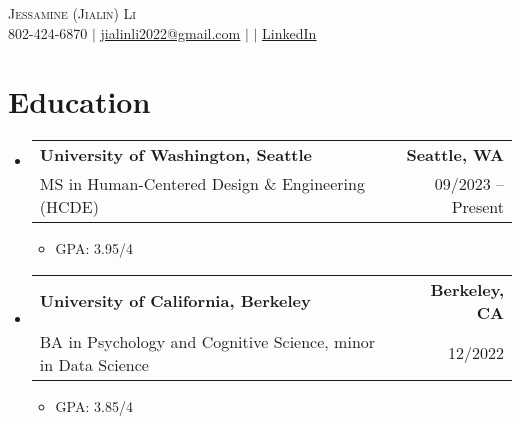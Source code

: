\documentclass[letterpaper,11pt]{article}
\makeatletter
\newcommand{\resumeItem}[1]{
  \item\small{
    {#1 \vspace{-2pt}}
  }
}
\newcommand{\resumeSubheading}[4]{
  \vspace{-2pt}\item
    \begin{tabular*}{1.0\textwidth}[t]{l@{\extracolsep{\fill}}r}
      \textbf{#1} & \textbf{\small #2} \\
      \small#3 & \small #4 \\
    \end{tabular*}\vspace{-7pt}
}
\newcommand{\resumeSubHeadingListStart}{\begin{itemize}[leftmargin=0.0in, label={}]}
\newcommand{\resumeSubHeadingListEnd}{\end{itemize}}
\newcommand{\resumeItemListStart}{\begin{itemize}}
\newcommand{\resumeItemListEnd}{\end{itemize}\vspace{-5pt}}
\makeatother
\begin{document}

\begin{center}
    {\huge \scshape Jessamine (Jialin) Li} \\ \vspace{1pt}
\small 802-424-6870 $|$ \href{mailto:jialinli2022@gmail.com}{\underline{jialinli2022@gmail.com}} $|$
    \href{https://drive.google.com/file/d/1YKK-KWSVWAUzx54oubQwrf9IYxWK2dGi/view}{}$|$
    \href{https://www.linkedin.com/in/jessamine-li/}{\small{\color{blue}\underline{LinkedIn}}} 
    \vspace{-8pt}
\end{center}

\vspace{-15pt}
\section{Education}
  \resumeSubHeadingListStart

  \vspace{-3pt}
    \resumeSubheading
      {University of Washington, Seattle}{Seattle, WA}
      {MS in Human-Centered Design \& Engineering (HCDE)}{09/2023 -- Present}
      \resumeItemListStart
        \resumeItem{GPA: 3.95/4}
        \resumeItemListEnd
  \vspace{-3pt}        
      \resumeSubheading
      {University of California, Berkeley}{Berkeley, CA}
      {BA in Psychology and Cognitive Science, minor in Data Science}{12/2022}
      \resumeItemListStart
        \resumeItem{GPA: 3.85/4}
      \resumeItemListEnd


  \resumeSubHeadingListEnd
\end{document}

